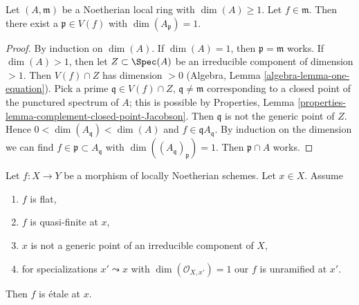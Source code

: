 \begin{lemma}
\label{lemma-find-point-codim-1}
Let $(A, \mathfrak m)$ be a Noetherian local ring with $\dim(A) \geq 1$.
Let $f \in \mathfrak m$. Then there exist a $\mathfrak p \in V(f)$ with
$\dim(A_\mathfrak p) = 1$.
\end{lemma}

\begin{proof}
By induction on $\dim(A)$. If $\dim(A) = 1$, then $\mathfrak p = \mathfrak m$
works. If $\dim(A) > 1$, then let $Z \subset \Spec(A)$ be an irreducible
component of dimension $> 1$. Then $V(f) \cap Z$ has dimension $> 0$
(Algebra, Lemma \ref{algebra-lemma-one-equation}). Pick a prime
$\mathfrak q \in V(f) \cap Z$, $\mathfrak q \not = \mathfrak m$
corresponding to a closed point of the punctured spectrum of $A$;
this is possible by
Properties, Lemma \ref{properties-lemma-complement-closed-point-Jacobson}.
Then $\mathfrak q$ is not the generic point of $Z$. Hence
$0 < \dim(A_\mathfrak q) < \dim(A)$ and $f \in \mathfrak q A_\mathfrak q$.
By induction on the dimension we can find
$f \in \mathfrak p \subset A_\mathfrak q$ with
$\dim((A_\mathfrak q)_\mathfrak p) = 1$.
Then $\mathfrak p \cap A$ works.
\end{proof}

\begin{lemma}
\label{lemma-ramification-quasi-finite-flat}
Let $f : X \to Y$ be a morphism of locally Noetherian schemes.
Let $x \in X$. Assume
\begin{enumerate}
\item $f$ is flat,
\item $f$ is quasi-finite at $x$,
\item $x$ is not a generic point of an irreducible component of $X$,
\item for specializations $x' \leadsto x$ with
$\dim(\mathcal{O}_{X, x'}) = 1$ our $f$ is unramified at $x'$.
\end{enumerate}
Then $f$ is \'etale at $x$.
\end{lemma}

